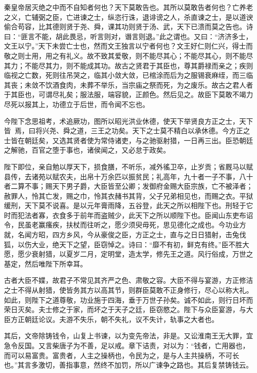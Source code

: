 \documentclass[]{article}
\begin{document}
秦皇帝居灭绝之中而不自知者何也？天下莫敢告也。其所以莫敢告者何也？亡养老之义，亡辅弼之臣，亡进谏之士，纵恣行诛，退诽谤之人，杀直谏之士，是以道谀偷合苟容，比其德则贤于尧、舜，课其功则贤于汤、武，天下已溃而莫之告也。诗曰：``匪言不能，胡此畏忌，听言则对，谮言则退。''此之谓也。又曰：``济济多士，文王以宁。''天下未尝亡士也，然而文王独言以宁者何也？文王好仁则仁兴，得士而敬之则士用，用之有礼义。故不致其爱敬，则不能尽其心；不能尽其心，则不能尽其力；不能尽其力，则不能成其功。故古之贤君于其臣也，尊其爵禄而亲之；疾则临视之亡数，死则往吊哭之，临其小敛大敛，已棺涂而后为之服锡衰麻绖，而三临其丧；未敛不饮酒食肉，未葬不举乐，当宗庙之祭而死，为之废乐。故古之君人者于其臣也，可谓尽礼矣；服法服，端容貌，正颜色。然后见之。故臣下莫敢不竭力尽死以报其上，功德立于后世，而令闻不忘也。

今陛下念思祖考，术追厥功，图所以昭光洪业休德，使天下举贤良方正之士，天下皆焉，曰将兴尧、舜之道，三王之功矣。天下之士莫不精白以承休德。今方正之士皆在朝廷矣，又选其贤者使为常侍诸吏，与之驰驱射猎，一日再三出。臣恐朝廷之解驰，百官之堕于事也，诸侯闻之，又必怠于政矣。

陛下即位，亲自勉以厚天下，损食膳，不听乐，减外徭卫卒，止岁贡；省厩马以赋县传，去诸苑以赋农夫，出帛十万余匹以振贫民；礼高年，九十者一子不事，八十者二算不事；赐天下男子爵，大臣皆至公卿；发御府金赐大臣宗族，亡不被泽者；赦罪人，怜其亡发，赐之巾，怜其衣赭书其背，父子兄弟相见也，而赐之衣。平狱缓刑，天下莫不说喜。是以元年膏雨降，五谷登，此天之所以相陛下也。刑轻于它时而犯法者寡，衣食多于前年而盗贼少，此天下之所以顺陛下也。臣闻山东吏布诏令，民虽老赢瘙疾，扶杖而往听之，愿少须臾毋死，思见德化之成也。今功业方就，名闻方昭，四方乡风，今从豪俊之臣，方正之士，直与之日日猎射，击兔伐狐，以伤大业，绝天下之望，臣窃悼之。诗曰：``靡不有初，鲜克有终。''臣不胜大愿，愿少衰射猎，以夏岁二月，定明堂，造太学，修先王之道。风行俗成，万世之基定，然后唯陛下所幸耳。

古者大臣不媟，故君子不常见其齐严之色、肃敬之容。大臣不得与宴游，方正修洁之士不得从射猎，使皆务其方以高其节，则群臣莫敢不正身修行，尽心以称大礼。如此，则陛下之道尊敬，功业施于四海，垂于万世子孙矣。诚不如此，则行日坏而荣日灭矣。夫士修之于家，而坏之于天子之廷，臣窃愍之。陛下与众臣宴游，与大臣方正朝廷论议。夫游不失乐，朝不失礼，议不失计，轨事之大者也。

其后，文帝除铸钱令，山复上书谏，以为变先帝法，非是。又讼淮南王无大罪，宜急令反国。又言柴唐子为不善，足以戒。章下诘责，对以为：``钱者，亡用器也，而可以易富贵。富贵者，人主之操柄也，令民为之，是与人主共操柄，不可长也。''其言多激切，善指事意，然终不加罚，所以广谏争之路也。其后复禁铸钱云。
\end{document}
